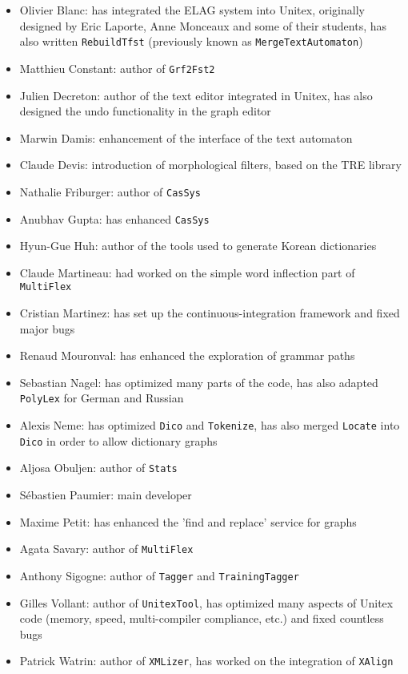 \begin{itemize}
    \item Olivier Blanc: has integrated the ELAG system into Unitex, originally
    designed by Eric Laporte, Anne Monceaux and some of their students, has
    also written \verb+RebuildTfst+ (previously known as
    \verb+MergeTextAutomaton+)
    \item Matthieu Constant: author of \verb+Grf2Fst2+
    \item Julien Decreton: author of the text editor integrated in Unitex,
    has also designed the undo functionality in the graph editor
    \item Marwin Damis: enhancement of the interface of the text automaton
    \item Claude Devis: introduction of morphological filters, 
    based on the TRE library
    \item Nathalie Friburger: author of \verb+CasSys+
    \item Anubhav Gupta: has enhanced \verb+CasSys+
    \item Hyun-Gue Huh: author of the tools used to
    generate Korean dictionaries
    \item Claude Martineau: had worked on the simple word inflection part of
    \verb+MultiFlex+
    \item Cristian Martinez: has set up the continuous-integration framework and
    fixed major bugs
    \item  Renaud Mouronval: has enhanced the exploration of grammar paths
    \item Sebastian Nagel: has optimized many parts of the code, has also
    adapted \verb+PolyLex+ for German and Russian
    \item Alexis Neme: has optimized \verb+Dico+ and \verb+Tokenize+, has also
    merged \verb+Locate+ into \verb+Dico+ in order to allow dictionary graphs 
    \item Aljosa Obuljen: author of \verb+Stats+
    \item S\'ebastien Paumier: main developer
    \item Maxime Petit: has enhanced the 'find and replace' service for graphs
    \item Agata Savary: author of \verb+MultiFlex+
    \item Anthony Sigogne: author of \verb+Tagger+ and \verb+TrainingTagger+
    \item Gilles Vollant: author of \verb+UnitexTool+, has optimized many
    aspects of Unitex code (memory, speed, multi-compiler compliance, etc.) and
    fixed countless bugs
    \item Patrick Watrin: author of \verb+XMLizer+, has worked on the
    integration of \verb+XAlign+
\end{itemize}


